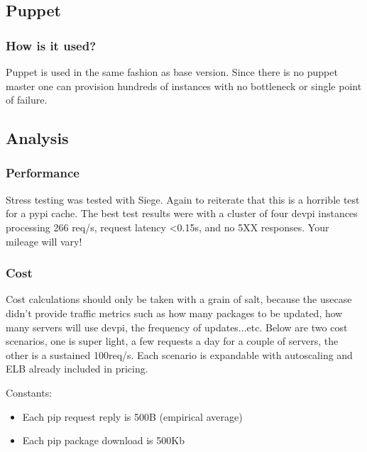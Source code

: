 \documentclass[12pt, letterpaper]{article}
\begin{document}
\subsection{Puppet}
\subsubsection{How is it used?}
Puppet is used in the same fashion as base version. Since there is no puppet master one can provision hundreds of instances
with no bottleneck or single point of failure.

\subsection{Analysis}
\subsubsection{Performance}
Stress testing was tested with Siege. Again to reiterate that this is a horrible test for a pypi cache. The best test
results were with a cluster of four devpi instances processing 266 req/s, request latency \textless 0.15s, and no 5XX responses.
Your mileage will vary!

\subsubsection{Cost}
Cost calculations should only be taken with a grain of salt, because the usecase didn't provide traffic metrics such as
how many packages to be updated, how many servers will use devpi, the frequency of updates...etc. Below are two cost scenarios,
one is super light, a few requests a day for a couple of servers, the other is a sustained 100req/s. Each scenario is 
expandable with autoscaling and ELB already included in pricing.

Constants:
\begin{itemize}
    \item Each pip request reply is 500B (empirical average)
    \item Each pip package download is 500Kb
\end{itemize}
\end{document}

